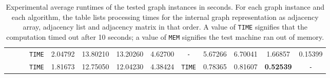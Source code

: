 \begin{table}
{\begin{tabular}{ l c c | c c c c c c c c c c }
 &  &  & \verb|TIME| & 2.04792 & 13.80210 & 13.20260 & 4.62700 & \verb|-| & 5.67266 & 6.70041 & 1.66857 & 0.15399 \\
 &  &  & \verb|TIME| & 1.81673 & 12.75050 & 12.04230 & 4.38424 & \verb|TIME| & 0.78365 & 0.81607 & \textbf{0.52539} & \verb|-| \\
\hline
  \end{tabular}
}
\caption{Experimental average runtimes of the tested graph instances in seconds. For each graph instance and each algorithm, the table lists processing times for the internal graph representation as adjacency array, adjacency list and adjacency matrix in that order. A value of \texttt{TIME} signifies that the computation timed out after 10 seconds; a value of \texttt{MEM} signifies the test machine ran out of memory.}
\label{results}
\end{table}

